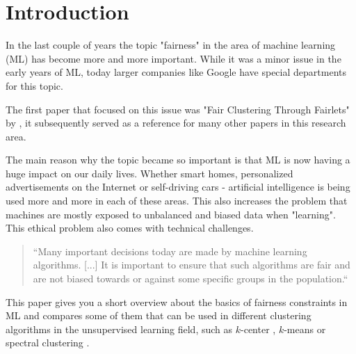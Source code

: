 \section{Introduction}

In the last couple of years the topic "fairness" in the area of machine learning (ML) has become more and more important. While it was a minor issue in the early years of ML, today larger companies like Google have special departments for this topic.

The first paper that focused on this issue was "Fair Clustering Through Fairlets" by \textcite{Chierichetti2018}, it subsequently served as a reference for many other papers in this research area.

The main reason why the topic became so important is that ML is now having a huge impact on our daily lives. Whether smart homes, personalized advertisements on the Internet or self-driving cars - artificial intelligence is being used more and more in each of these areas. This also increases the problem that machines are mostly exposed to unbalanced and biased data when "learning". This ethical problem also comes with technical challenges.

\begin{quote}
    ``Many important decisions today are made by machine learning algorithms. [...] It is important to ensure that such algorithms are fair and are not biased towards or against some specific groups in the population.``
    
\autocite[1]{Bera2019}
\end{quote}


This paper gives you a short overview about the basics of fairness constraints in ML and compares some of them that can be used in different clustering algorithms in the unsupervised learning \autocite[]{Barlow1989} field, such as $k$-center \autocite[]{Chierichetti2018}, $k$-means \autocite[]{Schmidt2018} or spectral clustering \autocite[]{Kleindessner2019}.
